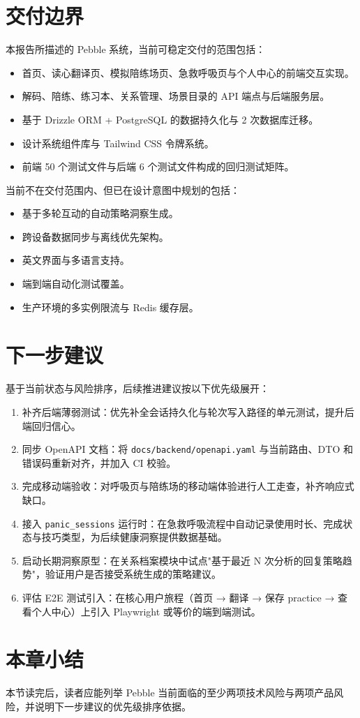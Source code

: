 \section{交付边界}

本报告所描述的 Pebble 系统，当前可稳定交付的范围包括：

\begin{itemize}
  \item 首页、读心翻译页、模拟陪练场页、急救呼吸页与个人中心的前端交互实现。
  \item 解码、陪练、练习本、关系管理、场景目录的 API 端点与后端服务层。
  \item 基于 Drizzle ORM + PostgreSQL 的数据持久化与 2 次数据库迁移。
  \item 设计系统组件库与 Tailwind CSS 令牌系统。
  \item 前端 50 个测试文件与后端 6 个测试文件构成的回归测试矩阵。
\end{itemize}

当前不在交付范围内、但已在设计意图中规划的包括：

\begin{itemize}
  \item 基于多轮互动的自动策略洞察生成。
  \item 跨设备数据同步与离线优先架构。
  \item 英文界面与多语言支持。
  \item 端到端自动化测试覆盖。
  \item 生产环境的多实例限流与 Redis 缓存层。
\end{itemize}

\section{下一步建议}

基于当前状态与风险排序，后续推进建议按以下优先级展开：

\begin{enumerate}
  \item 补齐后端薄弱测试：优先补全会话持久化与轮次写入路径的单元测试，提升后端回归信心。
  \item 同步 OpenAPI 文档：将 \texttt{docs/backend/openapi.yaml} 与当前路由、DTO 和错误码重新对齐，并加入 CI 校验。
  \item 完成移动端验收：对呼吸页与陪练场的移动端体验进行人工走查，补齐响应式缺口。
  \item 接入 \texttt{panic\_sessions} 运行时：在急救呼吸流程中自动记录使用时长、完成状态与技巧类型，为后续健康洞察提供数据基础。
  \item 启动长期洞察原型：在关系档案模块中试点"基于最近 N 次分析的回复策略趋势"，验证用户是否接受系统生成的策略建议。
  \item 评估 E2E 测试引入：在核心用户旅程（首页 → 翻译 → 保存 practice → 查看个人中心）上引入 Playwright 或等价的端到端测试。
\end{enumerate}

\section{本章小结}

本节读完后，读者应能列举 Pebble 当前面临的至少两项技术风险与两项产品风险，并说明下一步建议的优先级排序依据。
